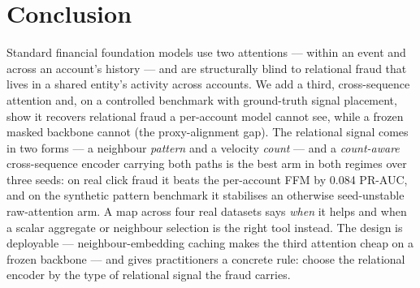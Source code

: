 \section{Conclusion}
\label{sec:conclusion}

Standard financial foundation models use two attentions --- within an event and across an account's
history --- and are structurally blind to relational fraud that lives in a shared entity's activity
across accounts. We add a third, cross-sequence attention and, on a controlled benchmark with
ground-truth signal placement, show it recovers relational fraud a per-account model cannot see,
while a frozen masked backbone cannot (the proxy-alignment gap). The relational signal comes in two
forms --- a neighbour \emph{pattern} and a velocity \emph{count} --- and a \emph{count-aware}
cross-sequence encoder carrying both paths is the best arm in both regimes over three seeds: on
real click fraud it beats the per-account FFM by \num{+0.084} PR-AUC, and on the synthetic pattern
benchmark it stabilises an otherwise seed-unstable raw-attention arm. A map across four real datasets says
\emph{when} it helps and when a scalar aggregate or neighbour selection is the right tool instead.
The design is deployable --- neighbour-embedding caching makes the third attention cheap on a frozen
backbone --- and gives practitioners a concrete rule: choose the relational encoder by the type of
relational signal the fraud carries.
